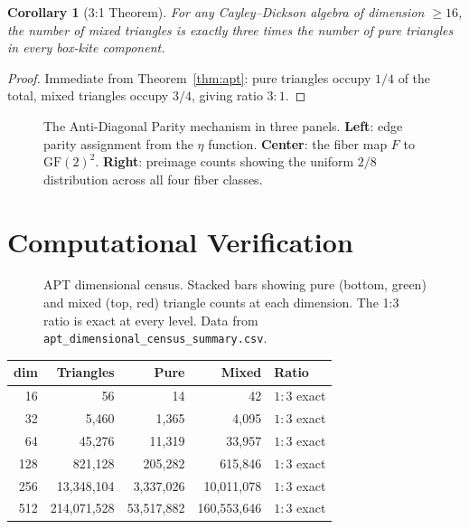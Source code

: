 \documentclass[12pt,openany]{report}
\theoremstyle{definition}
\theoremstyle{plain}
\newtheorem{corollary}[theorem]{Corollary}
\theoremstyle{remark}
\begin{document}
\begin{corollary}[3:1 Theorem]
For any Cayley--Dickson algebra of dimension $\geq 16$, the number of mixed
triangles is exactly three times the number of pure triangles in every
box-kite component.
\end{corollary}

\begin{proof}
Immediate from Theorem~\ref{thm:apt}: pure triangles occupy $1/4$ of the
total, mixed triangles occupy $3/4$, giving ratio $3:1$.
\end{proof}

\begin{figure}[htbp]
\centering

\caption{The Anti-Diagonal Parity mechanism in three panels.
\textbf{Left}: edge parity assignment from the $\eta$ function.
\textbf{Center}: the fiber map $F$ to $\mathrm{GF}(2)^2$.
\textbf{Right}: preimage counts showing the uniform $2/8$ distribution
across all four fiber classes.}
\label{fig:apt-mechanism}
\end{figure}

\section{Computational Verification}

\begin{figure}[htbp]
\centering

\caption{APT dimensional census.  Stacked bars showing pure (bottom,
\textcolor{OIgreen}{green}) and mixed (top,
\textcolor{OIvermillion}{red}) triangle counts at each dimension.
The 1:3 ratio is exact at every level.  Data from
\texttt{apt\_dimensional\_census\_summary.csv}.}
\label{fig:apt-census}
\end{figure}

\begin{center}
\begin{tabular}{rrrrl}
\toprule
\textbf{dim} & \textbf{Triangles} & \textbf{Pure} & \textbf{Mixed} & \textbf{Ratio} \\
\midrule
16  & 56 & 14 & 42 & $1:3$ exact \\
32  & 5,460 & 1,365 & 4,095 & $1:3$ exact \\
64  & 45,276 & 11,319 & 33,957 & $1:3$ exact \\
128 & 821,128 & 205,282 & 615,846 & $1:3$ exact \\
256 & 13,348,104 & 3,337,026 & 10,011,078 & $1:3$ exact \\
512 & 214,071,528 & 53,517,882 & 160,553,646 & $1:3$ exact \\
\bottomrule
\end{tabular}
\end{center}
\end{document}
